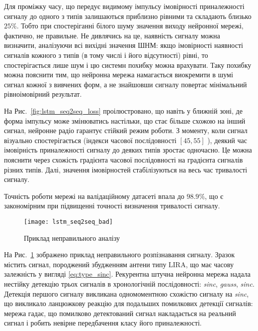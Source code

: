 Для проміжку часу, що передує видимому імпульсу імовірності приналежності 
сигналу до одного з типів залишаються 
приблизно рівними та складають близько $ 25 \% $. Тобто при спостеріганні 
білого шуму значення виходу нейронної мережі, фактично, не правильне. Не 
дивлячись на це, наявність сигналу можна визначити, аналізуючи всі вихідні 
значення ШНМ: якщо імовірності наявності сигналів кожного з типів (в тому 
числі і його відсутності) рівні, то спостерігається лише шум і цю системн 
похибку можна врахувати. Таку похибку можна пояснити тим, що нейронна мережа 
намагається виокремити в шумі сигнал кожної з вивчених форм, а не знайшовши 
сигналу повертає мінімальний рівноімовірний результат.

На Рис.~\ref{fig:lstm_seq2seq_loss} проілюстровано, що навіть у ближній зоні, 
де форма імпульсу може змінюватись настільки, що стає більше схожою на інший 
сигнал, нейронне радіо гарантує стійкий режим роботи. З моменту, коли сигнал 
візуально спостерігається (індекси часової послідовності 
$ \left[ 45, 55 \right]$ ), деякий час імовірність приналежності сигналу до 
деяких типів зростає одночасно. Це можна пояснити через схожість 
градієнта часової послідовності на градієнта сигналів різних типів. Далі,
значення імовірностей стабілізуються на весь час тривалості сигналу.

Точність роботи мережі на валідаційному датасеті впала до $ 98.9\% $,
що є закономірним при підвищенні точності визначення тривалості сигналу.

\begin{figure}[htbp] \begin{center}
\texttt{[image: lstm\_seq2seq\_bad]}
\caption{Приклад неправильного аналізу} \label{fig:lstm_seq2seq_bad}
\end{center} \end{figure}

На Рис.~\ref{fig:lstm_seq2seq_bad} зображено приклад неправильного
розпізнавання сигналу. Зразок містить сигнал, породжений збудженням антени 
типу LIRA, що має часову залежність у вигляді \eqref{eq:type_sinc}. 
Рекурентна штучна нейронна мережа надала нестійку
детекцію трьох сигналів в хронологічній послідовності: \textit{sinc}, 
\textit{gauss}, \textit{sinc}. Детекція першого сигналу викликана 
одномоментною схожістю сигналу на \textit{sinc}, що викликало ланцюжкову 
реакцію для подальших помилкових детекції сигналів: мережа гадає, що 
помилково детектований сигнал накладається на реальний сигнал і робить 
невірне передбачення класу його приналежності.

